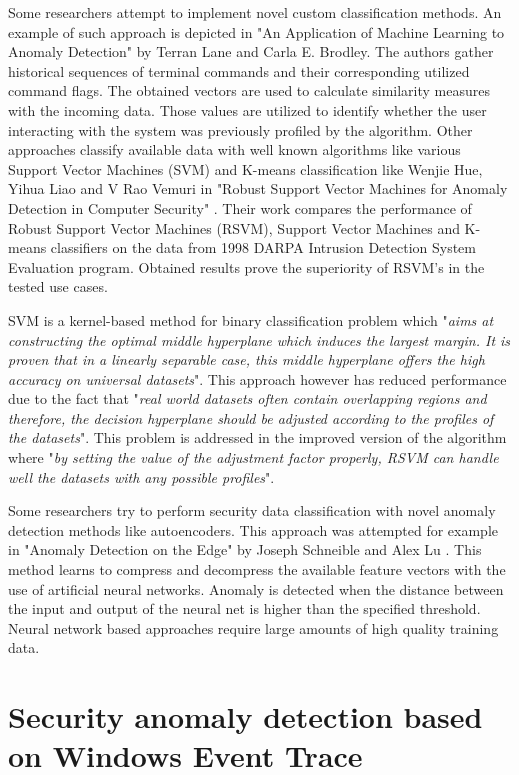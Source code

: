 \documentclass[a4paper,twoside,12pt]{book}
\begin{document}
Some researchers attempt to implement novel custom classification methods. An example of such 
approach is depicted in "An Application of Machine Learning to Anomaly Detection" by Terran Lane 
and Carla E. Brodley\cite{bib:lane1997application}. The authors gather historical sequences of
terminal commands and their corresponding utilized command flags. The obtained vectors are used
to calculate similarity measures with the incoming data. Those values are utilized to identify 
whether the user interacting with the system was previously profiled by the algorithm.
Other approaches classify available data with well known algorithms like various Support Vector 
Machines (SVM) and K-means classification like Wenjie Hue, Yihua Liao and V Rao Vemuri in "Robust Support Vector 
Machines for Anomaly Detection in Computer Security" \cite{bib:rsvm}. Their work compares the 
performance of Robust Support Vector Machines (RSVM), Support Vector Machines and K-means classifiers
on the data from 1998 DARPA Intrusion Detection System Evaluation program. Obtained results
prove the superiority of RSVM's in the tested use cases. 

SVM is a kernel-based method for binary classification problem which "\textit{aims at constructing 
the optimal middle hyperplane which induces the largest margin. It is proven that in a linearly 
separable case, this middle hyperplane offers the high accuracy on universal datasets}". This 
approach however has reduced performance due to the fact that "\textit{real world datasets often contain 
overlapping regions and therefore, the decision hyperplane should be adjusted according to the 
profiles of the datasets}". This problem is addressed in the improved version of the algorithm
where "\textit{by setting the value of the adjustment factor properly, RSVM can handle well the datasets 
with any possible profiles}"\cite{bib:svmandrsvm}.

Some researchers try to perform security
data classification with novel anomaly detection methods like autoencoders. This approach was
attempted for example in "Anomaly Detection on the Edge" by Joseph Schneible and Alex Lu
\cite{bib:autoencoderDist}. This method learns to compress and decompress the available feature 
vectors with the use of artificial neural networks. Anomaly is detected when the distance 
between the input and output of the neural net is higher than the specified threshold.
Neural network based approaches require large amounts of high quality training data.  

\chapter{Security anomaly detection based on Windows Event Trace}
\end{document}
